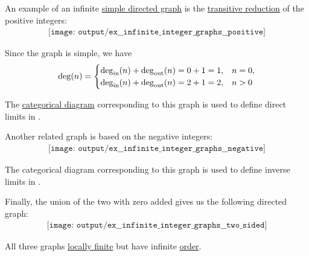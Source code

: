 \begin{example}\label{ex:infinite_integer_graphs}
  An example of an infinite \hyperref[def:directed_graph]{simple directed graph} is the \hyperref[def:transitive_reduction]{transitive reduction} of the positive integers:
  \begin{equation}\label{eq:ex:infinite_integer_graphs/positive}
    \begin{aligned}
      \texttt{[image: output/ex\_\_infinite\_integer\_graphs\_\_positive]}
    \end{aligned}
  \end{equation}

  Since the graph is simple, we have
  \begin{equation*}
    \deg(n) = \begin{cases}
      \deg_{\op{in}}(n) + \deg_{\op{out}}(n) = 0 + 1 = 1, &n = 0, \\
      \deg_{\op{in}}(n) + \deg_{\op{out}}(n) = 2 + 1 = 2, &n > 0 \\
    \end{cases}
  \end{equation*}

  The \hyperref[def:categorical_diagram]{categorical diagram} corresponding to this graph is used to define direct limits in .

  Another related graph is based on the negative integers:
  \begin{equation}\label{eq:ex:infinite_integer_graphs/negative}
    \begin{aligned}
      \texttt{[image: output/ex\_\_infinite\_integer\_graphs\_\_negative]}
    \end{aligned}
  \end{equation}

  The categorical diagram corresponding to this graph is used to define inverse limits in .

  Finally, the union of the two with zero added gives us the following directed graph:
  \begin{equation}\label{eq:ex:infinite_integer_graphs/two_sided}
    \begin{aligned}
      \texttt{[image: output/ex\_\_infinite\_integer\_graphs\_\_two\_sided]}
    \end{aligned}
  \end{equation}

  All three graphs \hyperref[def:graph_cardinality/local]{locally finite} but have infinite \hyperref[def:graph_cardinality/order]{order}.
\end{example}
